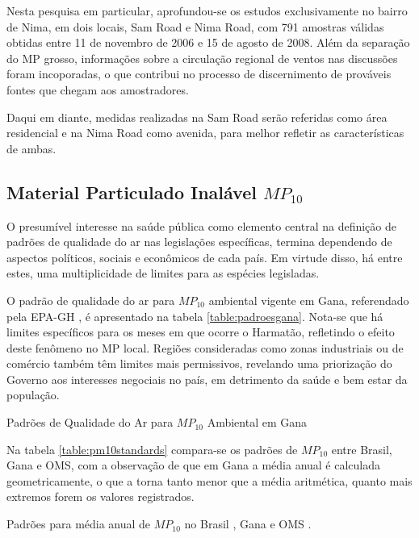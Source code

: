 Nesta pesquisa em particular, aprofundou-se os estudos exclusivamente no bairro
de Nima, em dois locais, Sam Road e Nima Road, com 791 amostras válidas obtidas
entre 11 de novembro de 2006 e 15 de agosto de 2008. Além da separação do MP 
grosso, informações sobre a circulação regional de ventos nas discussões foram 
incoporadas, o que contribui no processo de discernimento de prováveis fontes 
que chegam aos amostradores.

Daqui em diante, medidas realizadas na Sam Road serão referidas como área 
residencial e na Nima Road como avenida, para melhor refletir as características
de ambas.

\subsection{Material Particulado Inalável $MP_{10}$}

O presumível interesse na saúde pública como elemento central na definição de 
padrões de qualidade do ar nas legislações específicas, termina dependendo de
aspectos políticos, sociais e econômicos de cada país. Em virtude disso, há entre
estes, uma multiplicidade de limites para as espécies legisladas.

O padrão de qualidade do ar para $MP_{10}$ ambiental vigente em Gana, referendado
pela EPA-GH \citeyearpar{epa2015}, é apresentado na tabela 
\ref{table:padroesgana}. Nota-se que há limites específicos para os meses em que 
ocorre o Harmatão, refletindo o efeito deste fenômeno no MP local. 
Regiões consideradas como zonas industriais ou de comércio também têm limites 
mais permissivos, revelando uma priorização do Governo aos interesses negociais
no país, em detrimento da saúde e bem estar da população.

\begin{table}[H]
\centering
\caption{Padrões de Qualidade do Ar para $MP_{10}$ Ambiental em Gana
         \cite{epa2015} \label{table:padroesgana}}
  
\end{table}

Na tabela \ref{table:pm10standards} compara-se os padrões de $MP_{10}$ entre 
Brasil, Gana e OMS, com a observação de que em Gana a média anual é calculada 
geometricamente, o que a torna tanto menor que a média aritmética, quanto 
mais extremos forem os valores registrados.

\begin{table}[H]
\centering
  \caption{Padrões para média anual de $MP_{10}$ no Brasil \citep{conama1990}, 
           Gana \citep{epa2015} e OMS \citep{who}. \label{table:pm10standards}}
  
\end{table}

